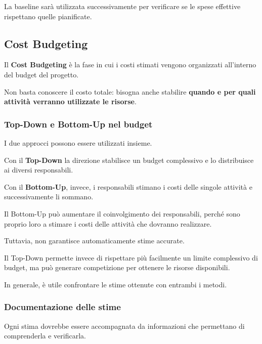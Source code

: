 \noindent La baseline sarà utilizzata
successivamente per verificare
se le spese effettive rispettano
quelle pianificate.


\subsection{Cost Budgeting}

\noindent Il \textbf{Cost Budgeting} è la fase
in cui i costi stimati vengono organizzati
all'interno del budget del progetto.

\noindent Non basta conoscere il costo totale:
bisogna anche stabilire
\textbf{quando e per quali attività
verranno utilizzate le risorse}.

\subsubsection*{Top-Down e Bottom-Up nel budget}

\noindent I due approcci possono essere
utilizzati insieme.

\medskip

\noindent Con il \textbf{Top-Down} la direzione
stabilisce un budget complessivo
e lo distribuisce ai diversi responsabili.

\noindent Con il \textbf{Bottom-Up},
invece, i responsabili stimano
i costi delle singole attività
e successivamente li sommano.

\medskip

\noindent Il Bottom-Up può aumentare
il coinvolgimento dei responsabili,
perché sono proprio loro a stimare
i costi delle attività che dovranno realizzare.

\noindent Tuttavia, non garantisce automaticamente
stime accurate.

\medskip

\noindent Il Top-Down permette invece
di rispettare più facilmente
un limite complessivo di budget,
ma può generare competizione
per ottenere le risorse disponibili.

\noindent In generale, è utile confrontare
le stime ottenute con entrambi i metodi.

\subsubsection*{Documentazione delle stime}

\noindent Ogni stima dovrebbe essere accompagnata
da informazioni che permettano di comprenderla
e verificarla.

